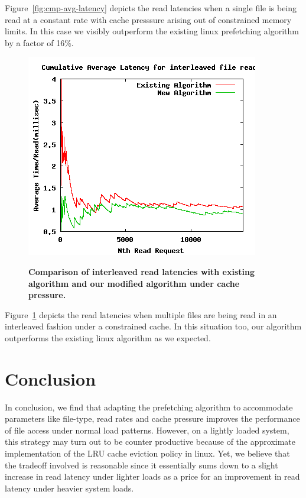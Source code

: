 \documentclass[twocolumn,10pt]{article}
\begin{document}
Figure~\ref{fig:cmp-avg-latency} depicts the read latencies when a single file is being read at a constant rate with cache presssure arising out of constrained memory limits. In this case we visibly outperform the existing linux prefetching algorithm by a factor of 16\%.

\begin{figure}[t!!]
\centering \resizebox{!}{2.8in}
{\includegraphics{cmp-avg-latency-2.png}}
\caption{\small \bf Comparison of interleaved read latencies with existing algorithm and
our modified algorithm under cache pressure.}
\label{fig:cmp-avg-latency-2}
\end{figure}

Figure~\ref{fig:cmp-avg-latency-2} depicts the read latencies when multiple files are being read in an interleaved fashion under a constrained cache. In this situation too, our algorithm outperforms the existing linux algorithm as we expected.

\section{Conclusion}

In conclusion, we find that adapting the prefetching algorithm to accommodate parameters like file-type, read rates and cache pressure improves the performance of file access under normal load patterns. However, on a lightly loaded system, this strategy may turn out to be counter productive because of the approximate implementation of the LRU cache eviction policy in linux. Yet, we believe that the tradeoff involved is reasonable since it essentially sums down to a slight increase in read latency under lighter loads as a price for an improvement in read latency under heavier system loads.
\end{document}
